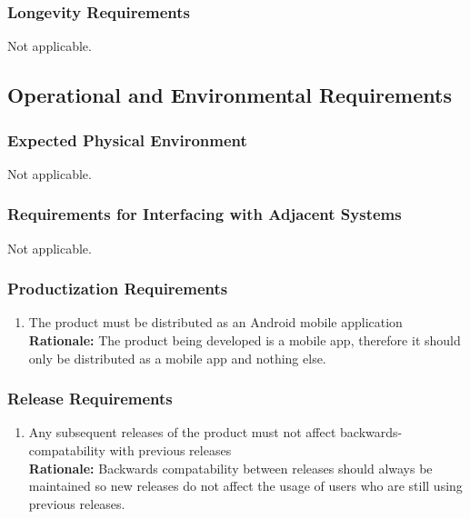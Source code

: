 \documentclass[]{article}
\begin{document}
\subsubsection{Longevity Requirements}
\label{ssub:longevity_requirements}
	Not applicable.


\subsection{Operational and Environmental Requirements}
\label{sub:operational_and_environmental_requirements}

\subsubsection{Expected Physical Environment}
\label{ssub:expected_physical_environment}
Not applicable.

\subsubsection{Requirements for Interfacing with Adjacent Systems}
\label{ssub:requirements_for_interfacing_with_adjacent_systems}
Not applicable.

\subsubsection{Productization Requirements}
\label{ssub:productization_requirements}
\begin{enumerate}[{OE-P}1. ]
	\item The product must be distributed as an Android mobile application \\
	{\bf Rationale:} The product being developed is a mobile app, therefore it should only be distributed as a mobile app and nothing else.
\end{enumerate}

\subsubsection{Release Requirements}
\label{ssub:release_requirements}
\begin{enumerate}[{OE-R}1. ]
	\item Any subsequent releases of the product must not affect backwards-compatability with previous releases \\
	{\bf Rationale:} Backwards compatability between releases should always be maintained so new releases do not affect the usage of users who are still using previous releases.
\end{enumerate}
\end{document}
